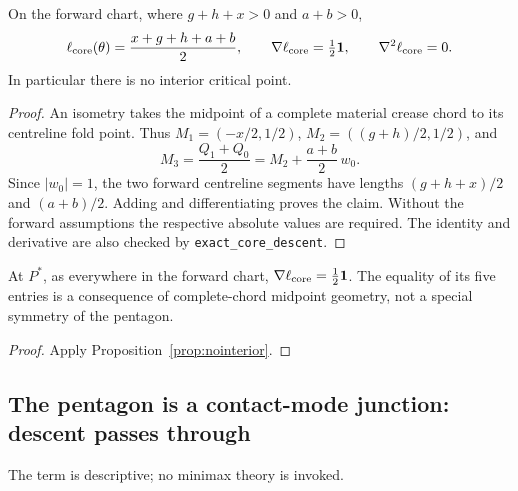 \begin{proposition}\label{prop:nointerior}
On the forward chart, where $g+h+x>0$ and $a+b>0$,
\[
  \ell_{\mathrm{core}}(\theta)=\frac{x+g+h+a+b}{2},\qquad
  \nabla\ell_{\mathrm{core}}=\tfrac12\mathbf1,\qquad \nabla^2\ell_{\mathrm{core}}=0.
\]
In particular there is no interior critical point.
\end{proposition}

\begin{proof}
An isometry takes the midpoint of a complete material crease chord to its centreline fold point. Thus
$M_1=(-x/2,1/2)$, $M_2=((g+h)/2,1/2)$, and
\[
M_3=\frac{Q_1+Q_0}{2}=M_2+\frac{a+b}{2}\,w_0.
\]
Since $|w_0|=1$, the two forward centreline segments have lengths $(g+h+x)/2$ and $(a+b)/2$. Adding and differentiating proves the claim. Without the forward assumptions the respective absolute values are required. The identity and derivative are also checked by \texttt{exact\_core\_descent}.
\end{proof}

\begin{proposition}\label{prop:gradpent}
At $P^*$, as everywhere in the forward chart, $\nabla\ell_{\mathrm{core}}=\tfrac12\mathbf1$. The equality of its five entries is a consequence of complete-chord midpoint geometry, not a special symmetry of the pentagon.
\end{proposition}
\begin{proof}
Apply Proposition~\ref{prop:nointerior}.
\end{proof}

\subsection{The pentagon is a contact-mode junction: descent passes through}

The term is descriptive; no minimax theory is invoked.

